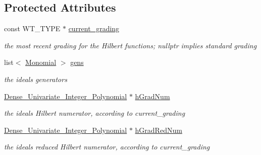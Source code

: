 \subsection*{Protected Attributes}
\begin{DoxyCompactItemize}
\item 
\mbox{\label{class_monomial___ideal_a5363a11d0bdbc878e3bdc201e620518e}} 
const W\+T\+\_\+\+T\+Y\+PE $\ast$ \hyperlink{class_monomial___ideal_a5363a11d0bdbc878e3bdc201e620518e}{current\+\_\+grading}
\begin{DoxyCompactList}\small\item\em the most recent grading for the Hilbert functions; {\ttfamily nullptr} implies standard grading \end{DoxyCompactList}\item 
\mbox{\label{class_monomial___ideal_a201c8da1d540749b19af0b4dea1dbe86}} 
list$<$ \hyperlink{class_monomial}{Monomial} $>$ \hyperlink{class_monomial___ideal_a201c8da1d540749b19af0b4dea1dbe86}{gens}
\begin{DoxyCompactList}\small\item\em the ideal\textquotesingle{}s generators \end{DoxyCompactList}\item 
\mbox{\label{class_monomial___ideal_a958dee87e6d37079b72c095b79ff0347}} 
\hyperlink{class_dense___univariate___integer___polynomial}{Dense\+\_\+\+Univariate\+\_\+\+Integer\+\_\+\+Polynomial} $\ast$ \hyperlink{class_monomial___ideal_a958dee87e6d37079b72c095b79ff0347}{h\+Grad\+Num}
\begin{DoxyCompactList}\small\item\em the ideal\textquotesingle{}s Hilbert numerator, according to current\+\_\+grading \end{DoxyCompactList}\item 
\mbox{\label{class_monomial___ideal_a383828c3e1596abe05b6184d45cd7f7a}} 
\hyperlink{class_dense___univariate___integer___polynomial}{Dense\+\_\+\+Univariate\+\_\+\+Integer\+\_\+\+Polynomial} $\ast$ \hyperlink{class_monomial___ideal_a383828c3e1596abe05b6184d45cd7f7a}{h\+Grad\+Red\+Num}
\begin{DoxyCompactList}\small\item\em the ideal\textquotesingle{}s reduced Hilbert numerator, according to current\+\_\+grading \end{DoxyCompactList}\item 

\end{DoxyCompactItemize}
